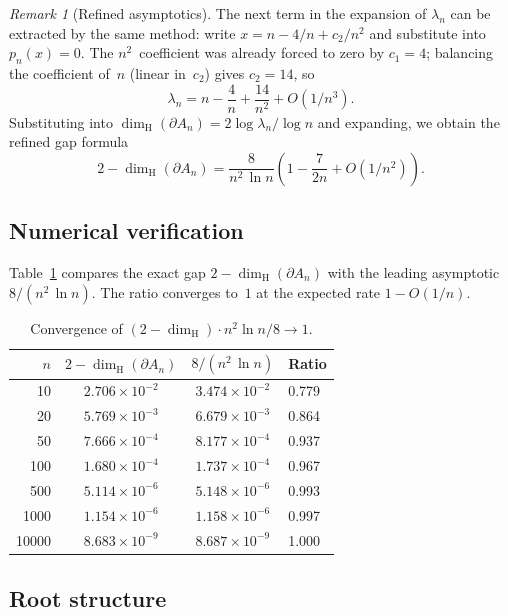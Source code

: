 \documentclass{amsart}
\theoremstyle{definition}
\theoremstyle{remark}
\newtheorem{remark}[theorem]{Remark}
\newcommand{\dH}{\dim_{\mathrm{H}}}
\begin{document}
\begin{remark}[Refined asymptotics]
The next term in the expansion of $\lambda_n$ can be extracted by the
same method: write $x = n - 4/n + c_2/n^2$ and substitute into
$p_n(x) = 0$.  The $n^2$~coefficient was already forced to zero by
$c_1 = 4$; balancing the coefficient of~$n$ (linear in~$c_2$) gives
$c_2 = 14$, so
\[
  \lambda_n = n - \frac{4}{n} + \frac{14}{n^2} + O(1/n^3).
\]
Substituting into $\dH(\partial A_n) = 2\log\lambda_n / \log n$ and
expanding, we obtain the refined gap formula
\[
  2 - \dH(\partial A_n)
  = \frac{8}{n^2\,\ln n}\left(1 - \frac{7}{2n} + O(1/n^2)\right).
\]
\end{remark}

\subsection{Numerical verification}

Table~\ref{tab:ratio} compares the exact gap $2 - \dH(\partial A_n)$
with the leading asymptotic $8/(n^2\,\ln n)$.  The ratio converges to~$1$
at the expected rate $1 - O(1/n)$.

\begin{table}[h]
\centering
\caption{Convergence of $(2 - \dH) \cdot n^2 \ln n / 8 \to 1$.}
\label{tab:ratio}
\begin{tabular}{rccl}
\toprule
$n$ & $2 - \dH(\partial A_n)$ & $8/(n^2\,\ln n)$ & Ratio \\
\midrule
   10 & $2.706 \times 10^{-2}$ & $3.474 \times 10^{-2}$ & 0.779 \\
   20 & $5.769 \times 10^{-3}$ & $6.679 \times 10^{-3}$ & 0.864 \\
   50 & $7.666 \times 10^{-4}$ & $8.177 \times 10^{-4}$ & 0.937 \\
  100 & $1.680 \times 10^{-4}$ & $1.737 \times 10^{-4}$ & 0.967 \\
  500 & $5.114 \times 10^{-6}$ & $5.148 \times 10^{-6}$ & 0.993 \\
 1000 & $1.154 \times 10^{-6}$ & $1.158 \times 10^{-6}$ & 0.997 \\
10000 & $8.683 \times 10^{-9}$ & $8.687 \times 10^{-9}$ & 1.000 \\
\bottomrule
\end{tabular}
\end{table}

\subsection{Root structure}
\label{ssec:roots}
\end{document}
